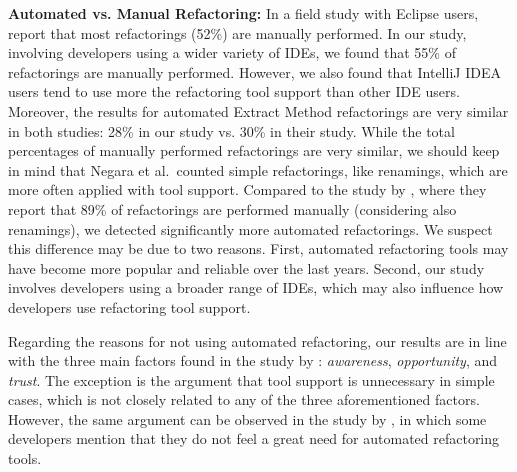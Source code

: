 \noindent\textbf{Automated vs. Manual Refactoring:} In a field study with Eclipse users, 
\cite{negara2013} report that most refactorings (52\%) are manually performed.
In our study, involving developers using a wider variety of IDEs, we found that 55\% of refactorings are manually performed. 
However, we also found that IntelliJ IDEA users tend to use more the refactoring tool support than other IDE users.
Moreover, the results for automated {\textsc Extract Method} refactorings are very similar in both studies: 28\% in our study vs. 30\% in their study.
While the total percentages of manually performed refactorings are very similar, we should
keep in mind that Negara et al.~counted simple refactorings, like renamings, which are more often applied with tool support.
Compared to the study by \cite{MurphyHill2012},
where they report that 89\% of refactorings are performed manually (considering also renamings),
we detected significantly more automated refactorings.
We suspect this difference may be due to two reasons.
First, automated refactoring tools may have become more popular and reliable
over the last years. Second, our study involves developers using a broader range of IDEs, which may also 
influence how developers use refactoring tool support.

Regarding the reasons for not using automated refactoring, our results are in line with the three main factors found in the study by \cite{MurphyHill2012}: \emph{awareness}, \emph{opportunity}, and \emph{trust}. 
The exception is the argument that tool support is unnecessary in simple cases, which is not closely 
related to any of the three aforementioned factors.
However, the same argument can be observed in the study by \cite{kim-tse-2014}, in which some 
developers mention that they do not feel a great need for automated refactoring tools.\margin

